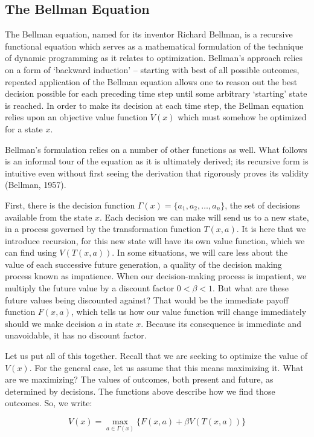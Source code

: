 \documentclass[letter,12pt]{article}
\begin{document}
\subsection{The Bellman Equation}
The Bellman equation, named for its inventor Richard Bellman, is a recursive functional equation which serves as a mathematical formulation of the technique of dynamic programming as it relates to optimization. Bellman's approach relies on a form of ‘backward induction’ – starting with best of all possible outcomes, repeated application of the Bellman equation allows one to reason out the best decision possible for each preceding time step until some arbitrary ‘starting’ state is reached. In order to make its decision at each time step, the Bellman equation relies upon an objective value function $V(x)$ which must somehow be optimized for a state $x$. 

Bellman's formulation relies on a number of other functions as well. What follows is an informal tour of the equation as it is ultimately derived; its recursive form is intuitive even without first seeing the derivation that rigorously proves its validity (Bellman, 1957).  

First, there is the decision function $\Gamma(x) = \{a_1,a_2,\ldots,a_n\}$, the set of decisions available from the state $x$. Each decision we can make will send us to a new state, in a process governed by the transformation function $T(x,a)$. It is here that we introduce recursion, for this new state will have its own value function, which we can find using $V(T(x,a))$. In some situations, we will care less about the value of each successive future generation, a quality of the decision making process known as impatience. When our decision-making process is impatient, we multiply the future value by a discount factor $0 < \beta< 1$. But what are these future values being discounted against? That would be the immediate payoff function $F(x,a)$, which tells us how our value function will change immediately should we make decision $a$ in state $x$. Because its consequence is immediate and unavoidable, it has no discount factor.

Let us put all of this together. Recall that we are seeking to optimize the value of $V(x)$. For the general case, let us assume that this means maximizing it. What are we maximizing? The values of outcomes, both present and future, as determined by decisions. The functions above describe how we find those outcomes. So, we write: 

$$V(x) = \max_{a \in \Gamma(x)}\{F(x,a)+\beta V(T(x,a))\}$$
\end{document}
